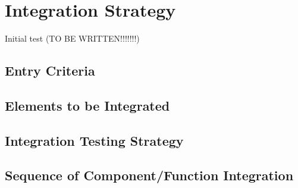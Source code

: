 \documentclass[\mainpath/main]{subfiles}
\begin{document}
\chapter{Integration Strategy} %
\label{IntegrationStrategy}

\setmyfancystyle

Initial test (TO BE WRITTEN!!!!!!!)

\section{Entry Criteria}
\label{IntegrationStrategy:EntryCriteria}

\section{Elements to be Integrated}
\label{IntegrationStrategy:ElementsToBeIntegrated}

\section{Integration Testing Strategy}
\label{IntegrationStrategy:IntegrationTestingStrategy}

\section{Sequence of Component/Function Integration}
\label{IntegrationStrategy:SequenceofComponent_FunctionIntegration}
\end{document}
